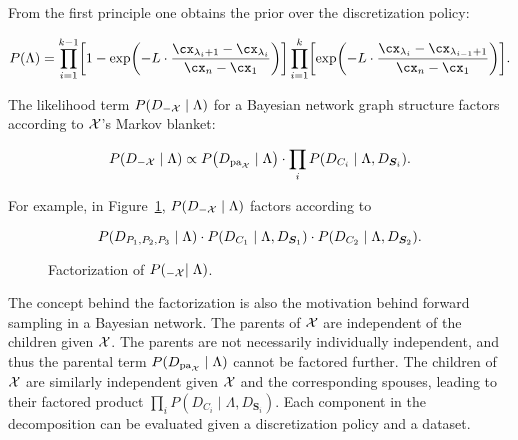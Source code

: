 From the first principle one obtains the prior over the discretization policy:

\begin{small}
\begin{equation}
  \label{eq:p_M}
  P(\Lambda) = \prod_{i=1}^{k-1}
    \brock{
      1 - \exp\paren{
        - L \cdot \frac{
                         \cx_{\lambda_i +1} - \cx_{\lambda_i}
                       }{
                         \cx_n - \cx_1
                        }
      }
    }
    \prod_{i=1}^{k}
	\brock{
    \exp\paren{
      -L \cdot \frac{\cx_{\lambda_{i}} - \cx_{\lambda_{i-1} + 1}}{\cx_n - \cx_1}}
    }\text{.}
\end{equation}
\end{small}

The likelihood term ${P(D_{-\mathcal{X}} \mid \Lambda)}$ for a Bayesian network graph structure factors according to $\mathcal{X}$'s Markov blanket:

\begin{equation}
  \label{eq:p_D_given_M}
  P\paren{D_{-\cX} \mid \Lambda} \propto P\paren{D_{\Pa_\cX} \mid \Lambda} \cdot \prod_{i} P\paren{D_{C_i} \mid \Lambda, D_{\bm{S}_i}}\text{.}
\end{equation}

For example, in Figure~\ref{fig:example_factorization}, $P(D_{-\mathcal{X}} \mid \Lambda)$ factors according to

\begin{equation}
  P\paren{D_{P_1,P_2,P_3} \mid \Lambda} \cdot P\paren{ D_{ C_1 } \mid \Lambda, D_{\bm{S}_1} } \cdot P\paren{D_{C_2} \mid \Lambda, D_{\bm{S}_2}}\text{.}
\end{equation}

\begin{figure}[ht]
  \centering
  
  \caption{Factorization of $P(_{-\mathcal{X}} \mid \Lambda)$.}
  \label{fig:example_factorization}
\end{figure}

The concept behind the factorization is also the motivation behind forward sampling in a Bayesian network.
The parents of $\mathcal{X}$ are independent of the children given $\mathcal{X}$.
The parents are not necessarily individually independent, and thus the parental term $P(D_{\operatorname{pa}_{\mathcal{X}}} \mid \Lambda)$ cannot be factored further.
The children of $\mathcal{X}$ are similarly independent given $\mathcal{X}$ and the corresponding spouses, leading to their factored product $\prod_{i} P(D_{C_i} \mid \Lambda, D_{\bm{S}_i})$.
Each component in the decomposition can be evaluated given a discretization policy and a dataset.

